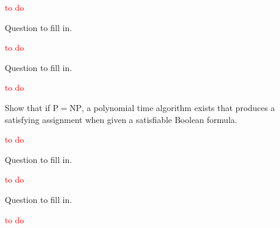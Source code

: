 \textcolor{red}{to do}

\setcounter{exercise}{35}

\begin{exercise}
  Question to fill in.
\end{exercise}

\textcolor{red}{to do}

\begin{exercise}
  Question to fill in.
\end{exercise}

\textcolor{red}{to do}

\begin{exercise}
  Show that if $\mathrm{P}=\mathrm{NP}$, a polynomial time algorithm exists that produces a satisfying assignment when given a satisfiable Boolean formula.
\end{exercise}

\textcolor{red}{to do}

\begin{exercise}
  Question to fill in.
\end{exercise}

\textcolor{red}{to do}

\setcounter{exercise}{50}

\begin{exercise}
  Question to fill in.
\end{exercise}

\textcolor{red}{to do}
